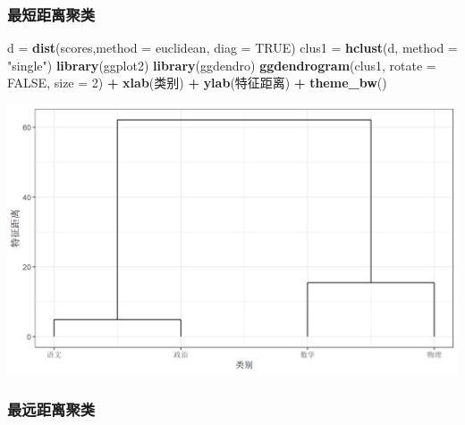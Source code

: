 \documentclass[
]{article}
\newenvironment{Shaded}{\begin{snugshade}}{\end{snugshade}}
\newcommand{\AttributeTok}[1]{\textcolor[rgb]{0.13,0.29,0.53}{#1}}
\newcommand{\ConstantTok}[1]{\textcolor[rgb]{0.56,0.35,0.01}{#1}}
\newcommand{\DecValTok}[1]{\textcolor[rgb]{0.00,0.00,0.81}{#1}}
\newcommand{\FunctionTok}[1]{\textcolor[rgb]{0.13,0.29,0.53}{\textbf{#1}}}
\newcommand{\NormalTok}[1]{#1}
\newcommand{\OtherTok}[1]{\textcolor[rgb]{0.56,0.35,0.01}{#1}}
\newcommand{\SpecialCharTok}[1]{\textcolor[rgb]{0.81,0.36,0.00}{\textbf{#1}}}
\newcommand{\StringTok}[1]{\textcolor[rgb]{0.31,0.60,0.02}{#1}}
\begin{document}
\subsubsection{最短距离聚类}\label{ux6700ux77edux8dddux79bbux805aux7c7b}

\begin{Shaded}
\begin{Highlighting}[]
\NormalTok{d }\OtherTok{=} \FunctionTok{dist}\NormalTok{(scores,}\AttributeTok{method =} \StringTok{\textquotesingle{}euclidean\textquotesingle{}}\NormalTok{, }\AttributeTok{diag =} \ConstantTok{TRUE}\NormalTok{)}
\NormalTok{clus1 }\OtherTok{=} \FunctionTok{hclust}\NormalTok{(d, }\AttributeTok{method =} \StringTok{"single"}\NormalTok{)}
\FunctionTok{library}\NormalTok{(ggplot2)}
\FunctionTok{library}\NormalTok{(ggdendro)}
\FunctionTok{ggdendrogram}\NormalTok{(clus1, }\AttributeTok{rotate =} \ConstantTok{FALSE}\NormalTok{, }\AttributeTok{size =} \DecValTok{2}\NormalTok{) }\SpecialCharTok{+}
  \FunctionTok{xlab}\NormalTok{(}\StringTok{\textquotesingle{}类别\textquotesingle{}}\NormalTok{) }\SpecialCharTok{+}
  \FunctionTok{ylab}\NormalTok{(}\StringTok{\textquotesingle{}特征距离\textquotesingle{}}\NormalTok{) }\SpecialCharTok{+}
  \FunctionTok{theme\_bw}\NormalTok{()}
\end{Highlighting}
\end{Shaded}

\begin{center}\includegraphics[width=1\linewidth,height=1\textheight]{../picture/rmd/exp7/unnamed-chunk-2-1.png} \end{center}

\subsubsection{最远距离聚类}\label{ux6700ux8fdcux8dddux79bbux805aux7c7b}
\end{document}
